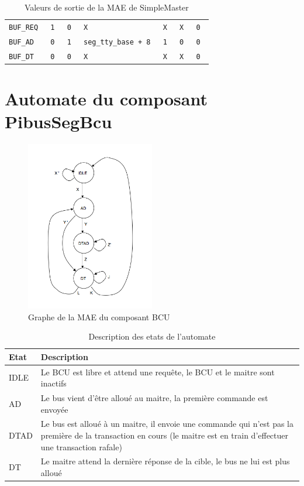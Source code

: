 \documentclass{article}
\begin{document}
\begin{table}[H]
\begin{tabular}{|l|l|l|l|l|l|l|}
\tt{BUF\_REQ}     & \tt{1}         & \tt{0}         & \tt{X}                  & \tt{X}             & \tt{X}         & \tt{0}         \\
\tt{BUF\_AD}      & \tt{0}         & \tt{1}         & \tt{seg\_tty\_base + 8} & \tt{1}             & \tt{0}         & \tt{0}         \\
\tt{BUF\_DT}      & \tt{0}         & \tt{0}         & \tt{X}                  & \tt{X}             & \tt{X}         & \tt{0}         \\
\hline
\end{tabular}
\endgroup
\caption{Valeurs de sortie de la MAE de SimpleMaster}
\end{table}


\section{Automate du composant PibusSegBcu}

\begin{figure}[H]
\includegraphics[width=0.5\textwidth]{pics/mae_bus.png}
\centering
\caption{Graphe de la MAE du composant BCU}
\label{mae_ram}
\end{figure}

\begin{table}[H]
\centering
\begingroup
\setlength{\tabcolsep}{5pt}
\renewcommand{\arraystretch}{1.1}
\begin{tabular}{ | l | p{15cm} |}
\hline
Etat    & Description \\
\hline
IDLE    &
Le BCU est libre et attend une requête,
le BCU et le maitre sont inactifs \\
\hline
AD      &
Le bus vient d'être alloué au maitre, la première commande est envoyée \\
\hline
DTAD    &
Le bus est alloué à un maitre, il envoie une commande qui n'est pas la première
de la transaction en cours (le maitre est en train d'effectuer une transaction rafale) \\
\hline
DT      &
Le maitre attend la dernière réponse de la cible, le bus ne lui est plus alloué \\
\hline
\end{tabular}
\endgroup
\caption{Description des etats de l'automate}
\end{table}
\end{document}
